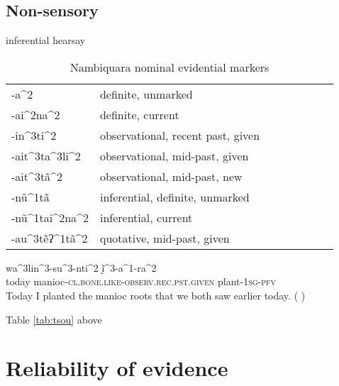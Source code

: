 \documentclass[oneside,a4paper,11pt]{article}
\newcommand{\ipa}[1]{{\phon \mbox{#1}}} %
\begin{document}
 



 
\citet{aikhenvald14knowledge}
 
 
 
\subsection{Non-sensory} 
 
inferential hearsay 
 
\citet[282]{lowe99nambiquara} 
 
 \begin{table}[H]
 \caption{Nambiquara nominal evidential markers} \centering
\begin{tabular}{llllllll}
\ipa{-a^2} & definite, unmarked \\
\ipa{-ai^2na^2} & definite, current \\
\ipa{-in^3ti^2} & observational, recent past, given \\
\ipa{-ait^3ta^3li^2} & observational, mid-past, given \\
\ipa{-ait^3tã^2} & observational, mid-past, new \\
\ipa{-nũ^1tã} & inferential, definite, unmarked \\
\ipa{-nũ^1tai^2na^2} & inferential, current \\
\ipa{-au^3tẽʔ^1tã^2} & quotative, mid-past, given \\
\end{tabular}
\end{table}

 \begin{exe}
\ex
\gll  \ipa{hĩ^1na^2su^2} \ipa{wa^3lin^3-su^3-nti^2} \ipa{ḭ̃^3-a^1-ra^2} \\
today manioc-\textsc{cl.bone.like-observ.rec.pst.given} plant-\textsc{1sg-pfv} \\
\glt Today I planted the manioc roots that we both saw earlier today. (\citealt[290, ex 62.]{lowe99nambiquara} ) 
  \end{exe}
 
 \citet[54]{yang00tsou.case}
 Table \ref{tab:tsou} above 
 

 
\section{Reliability of evidence} \label{sec:reliability}


 


 \citet[193]{eijk97lillooet}
 
\end{document}
